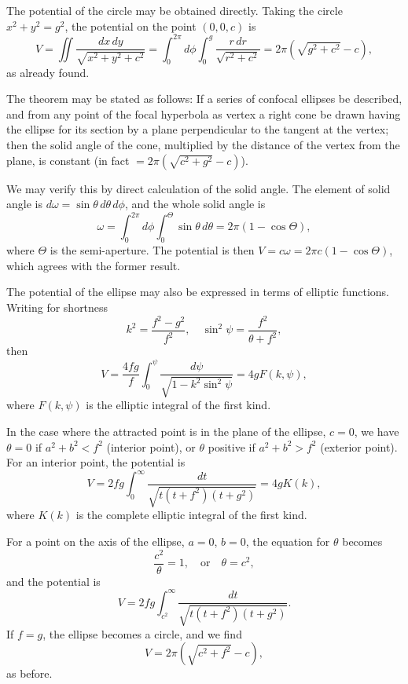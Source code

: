 \documentclass[11pt,a4paper]{book}
\begin{document}
\begin{art}
The potential of the circle may be obtained directly. Taking the circle $x^2 + y^2 = g^2$, the potential on the point $(0, 0, c)$ is
\[
V = \iint \frac{dx\,dy}{\sqrt{x^2 + y^2 + c^2}}
= \int_0^{2\pi} d\phi \int_0^g \frac{r\,dr}{\sqrt{r^2 + c^2}}
= 2\pi(\sqrt{g^2 + c^2} - c),
\]
as already found.
\end{art}

\begin{art}
The theorem may be stated as follows: If a series of confocal ellipses be described, and from any point of the focal hyperbola as vertex a right cone be drawn having the ellipse for its section by a plane perpendicular to the tangent at the vertex; then the solid angle of the cone, multiplied by the distance of the vertex from the plane, is constant (in fact $= 2\pi(\sqrt{c^2+g^2} - c)$).
\end{art}

\begin{art}
We may verify this by direct calculation of the solid angle. The element of solid angle is $d\omega = \sin\theta\,d\theta\,d\phi$, and the whole solid angle is
\[
\omega = \int_0^{2\pi} d\phi \int_0^{\Theta} \sin\theta\,d\theta
= 2\pi(1 - \cos\Theta),
\]
where $\Theta$ is the semi-aperture. The potential is then $V = c\omega = 2\pi c(1 - \cos\Theta)$, which agrees with the former result.
\end{art}

\begin{art}
The potential of the ellipse may also be expressed in terms of elliptic functions. Writing for shortness
\[
k^2 = \frac{f^2 - g^2}{f^2},
\quad
\sin^2\psi = \frac{f^2}{\theta + f^2},
\]
then
\[
V = \frac{4fg}{f}\int_0^{\psi} \frac{d\psi}{\sqrt{1 - k^2\sin^2\psi}}
= 4gF(k, \psi),
\]
where $F(k, \psi)$ is the elliptic integral of the first kind.
\end{art}

\begin{art}
In the case where the attracted point is in the plane of the ellipse, $c=0$, we have $\theta = 0$ if $a^2 + b^2 < f^2$ (interior point), or $\theta$ positive if $a^2 + b^2 > f^2$ (exterior point). For an interior point, the potential is
\[
V = 2fg\int_0^{\infty} \frac{dt}{\sqrt{t(t+f^2)(t+g^2)}}
= 4gK(k),
\]
where $K(k)$ is the complete elliptic integral of the first kind.
\end{art}

\begin{art}
For a point on the axis of the ellipse, $a=0$, $b=0$, the equation for $\theta$ becomes
\[
\frac{c^2}{\theta} = 1,
\quad \text{or} \quad \theta = c^2,
\]
and the potential is
\[
V = 2fg\int_{c^2}^{\infty} \frac{dt}{\sqrt{t(t+f^2)(t+g^2)}}.
\]
If $f=g$, the ellipse becomes a circle, and we find
\[
V = 2\pi(\sqrt{c^2 + f^2} - c),
\]
as before.
\end{art}
\end{document}
